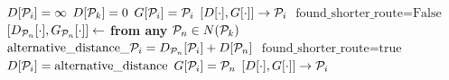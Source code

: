 \documentclass{article}
\begin{document}
\pagestyle{empty}

\newcommand{\send}{\Rightarrow}
\newcommand{\sendto}{\rightarrow}
\algrenewcommand{}

\begin{algorithmic}

  \State $D[{\cal P}_i] = \infty$
  \EndFor
  \State $D[{\cal P}_k] = 0$
  \State $G[{\cal P}_i] = {\cal P}_i$
  \EndFor
  \State $[D[\cdot], G[\cdot]] \sendto {\cal P}_i$
  \EndFor
  \State $\text{found\_shorter\_route} = \text{False}$
  \State $[D_{{\cal P}_n}[\cdot],G_{{\cal P}_n}[\cdot]] \gets$ \textbf{from any} ${\cal P}_n \in N({\cal P}_k)$
  \State $\text{alternative\_distance}\_{\cal P}_i = D_{{\cal P}_n}[{\cal P}_i] + D[{\cal P}_n]$
  \State $\text{found\_shorter\_route} = \text{true}$
  \State $D[{\cal P}_i] = \text{alternative\_distance}$
  \State $G[{\cal P}_i] = {\cal P}_n$
  \EndIf
  \EndFor
  \State $[D[\cdot],G[\cdot]] \sendto {\cal P}_i$
  \EndFor
  \EndIf
  \EndWhile
  \EndProcedure
  
\end{algorithmic}
\end{document}
